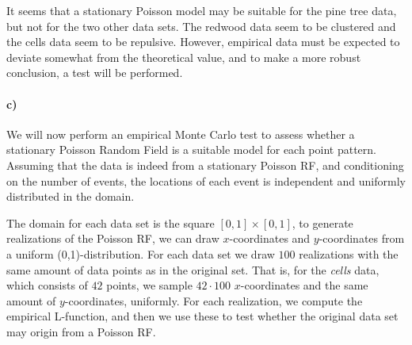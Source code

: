 It seems that a stationary Poisson model may be suitable for the pine tree data, but not for the two other data sets. The redwood data seem to be clustered and the cells data seem to be repulsive. However, empirical data must be expected to deviate somewhat from the theoretical value, and to make a more robust conclusion, a test will be performed.

\paragraph{c)}
We will now perform an empirical Monte Carlo test to assess whether a stationary Poisson Random Field is a suitable model for each point pattern. Assuming that the data is indeed from a stationary Poisson RF, and conditioning on the number of events, the locations of each event is independent and uniformly distributed in the domain. 

The domain for each data set is the square $[0,1] \times [0,1]$, to generate realizations of the Poisson RF, we can draw $x$-coordinates and $y$-coordinates from a uniform (0,1)-distribution. For each data set we draw $100$ realizations with the same amount of data points as in the original set. That is, for the \textit{cells} data, which consists of $42$ points, we sample $42\cdot 100$ $x$-coordinates and the same amount of $y$-coordinates, uniformly. For each realization, we compute the empirical L-function, and then we use these to test whether the original data set may origin from a Poisson RF.


